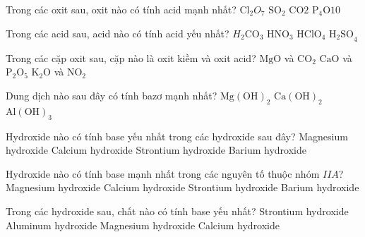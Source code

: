 \begin{ex}%
	Trong các oxit sau, oxit nào có tính acid mạnh nhất?
	\choice
	{\True $\mathrm{Cl}_2O_7$}
	{$\mathrm{SO}_2$}
	{$\mathrm{CO}2$}
	{$\mathrm{P_4O{10}}$}
\end{ex}
\begin{ex}%
	Trong các acid sau, acid nào có tính acid yếu nhất?
	\choice
	{\True $H_2\mathrm{CO}_3$}
	{$\mathrm{HNO}_3$}
	{$\mathrm{HClO}_4$}
	{$\mathrm{H_2SO}_4$}
\end{ex}
\begin{ex}%
	Trong các cặp oxit sau, cặp nào là oxit kiềm và oxit acid?
	{$\mathrm{MgO}$ và $\mathrm{CO}_2$}
	{$\mathrm{CaO}$ và $\mathrm{P_2O_5}$}
	{$\mathrm{K_2O}$ và $\mathrm{NO}_2$}
\end{ex}
\begin{ex}%
	Dung dịch nào sau đây có tính bazơ mạnh nhất?
	{$\mathrm{Mg(OH)}_2$}
	{$\mathrm{Ca(OH)}_2$}
	{$\mathrm{Al(OH)}_3$}
\end{ex}
\begin{ex}%
	Hydroxide nào có tính base yếu nhất trong các hydroxide sau đây?
	\choice
	{\True Magnesium hydroxide}
	{Calcium hydroxide}
	{Strontium hydroxide}
	{Barium hydroxide}
\end{ex}
\begin{ex}%
	Hydroxide nào có tính base mạnh nhất trong các nguyên tố thuộc nhóm $IIA$?
	\choice
	{Magnesium hydroxide}
	{Calcium hydroxide}
	{Strontium hydroxide}
	{\True Barium hydroxide}
\end{ex}
\begin{ex}%
	Trong các hydroxide sau, chất nào có tính base yếu nhất?
	\choice
	{Strontium hydroxide}
	{\True Aluminum hydroxide}
	{Magnesium hydroxide}
	{Calcium hydroxide}
\end{ex}
